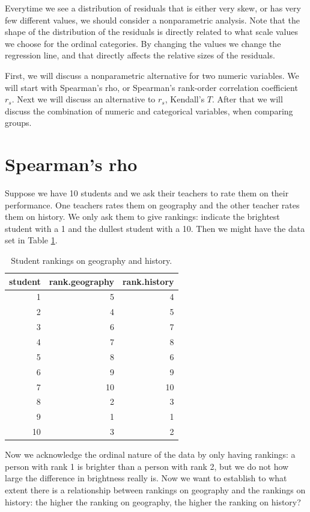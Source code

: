 \documentclass[]{book}\usepackage[]{graphicx}\usepackage[]{color}
\begin{document}
Everytime we see a distribution of residuals that is either very skew, or has very few different values, we should consider a nonparametric analysis. Note that the shape of the distribution of the residuals is directly related to what scale values we choose for the ordinal categories. By changing the values we change the regression line, and that directly affects the relative sizes of the residuals. 

First, we will discuss a nonparametric alternative for two numeric variables. We will start with Spearman's rho, or Spearman's rank-order correlation coefficient $r_s$. Next we will discuss an alternative to $r_s$, Kendall's $T$. After that we will discuss the combination of numeric and categorical variables, when comparing groups.

\section{Spearman's rho}

Suppose we have 10 students and we ask their teachers to rate them on their performance. One teachers rates them on geography and the other teacher rates them on history. We only ask them to give rankings: indicate the brightest student with a 1 and the dullest student with a 10. Then we might have the data set in Table \ref{tab:nonpar_3}.

\begin{table}[ht]
\centering
\caption{Student rankings on geography and history.} 
\label{tab:nonpar_3}
\begin{tabular}{rrr}
  \hline
student & rank.geography & rank.history \\ 
  \hline
1 & 5 & 4 \\ 
  2 & 4 & 5 \\ 
  3 & 6 & 7 \\ 
  4 & 7 & 8 \\ 
  5 & 8 & 6 \\ 
  6 & 9 & 9 \\ 
  7 & 10 & 10 \\ 
  8 & 2 & 3 \\ 
  9 & 1 & 1 \\ 
  10 & 3 & 2 \\ 
   \hline
\end{tabular}
\end{table}


Now we acknowledge the ordinal nature of the data by only having rankings: a person with rank 1 is brighter than a person with rank 2, but we do not how large the difference in brightness really is. Now we want to establish to what extent there is a relationship between rankings on geography and the rankings on history: the higher the ranking on geography, the higher the ranking on history?
\end{document}
